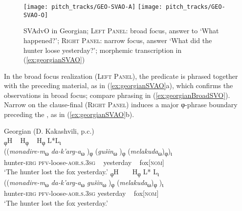 \documentclass[output=paper,colorlinks,citecolor=brown]{langscibook}
\begin{document}
\begin{figure}
    \texttt{[image: pitch\_tracks/GEO-SVAO-A]}
    \texttt{[image: pitch\_tracks/GEO-SVAO-O]}
    \caption{SVAdvO in Georgian; \textsc{Left Panel}: broad focus, answer to `What happened?’; \textsc{Right Panel}: narrow focus, answer `What did the hunter loose yesterday?’; morphemic transcription in (\ref{ex:georgianSVAO})}
    \label{fig:georgianSVAO}
\end{figure}

In the broad focus realization (\textsc{Left Panel}), the predicate is phrased together with the preceding material, as in (\ref{ex:georgianSVAO}a), which confirms the observations in broad focus; compare phrasing in (\ref{ex:georgianBroadSVO}). Narrow  on the clause-final  (\textsc{Right Panel}) induces a major φ-phrase boundary preceding the , as in (\ref{ex:georgianSVAO}b).

\ea \label{ex:georgianSVAO}
    Georgian (D. Kakashvili, p.c.) \\
    \ea 
        \glll \textup{\textsubscript{φ}H} ~ \textup{H\textsubscript{φ}} ~ \textup{H\textsubscript{φ}} \hspace{0.4cm}\textup{L*}\hspace{1.4cm}\textup{L\textsubscript{ι}}\\
            ((\textit{monadire-m}\textsubscript{ω} \textit{da-k’arg-a}\textsubscript{ω} )\textsubscript{φ} (\textit{gušin}\textsubscript{ω} )\textsubscript{φ} (\textit{melakuda}\textsubscript{ω})\textsubscript{φ})\textsubscript{ι}\\
            hunter-\textsc{erg} \textsc{pfv-}loose-\textsc{aor.s.3sg} ~ yesterday ~ fox\textsc{[nom]}\\
            \glt ‘The hunter lost the fox yesterday.’
    \ex 
        \glll \textup{\textsubscript{φ}H} ~ ~ \textup{H\textsubscript{φ}} \hspace{0.4cm}\textup{L*} \textup{L\textsubscript{ι}} \\
            ((\textit{monadire-m}\textsubscript{ω}  \textit{da-k’arg-a}\textsubscript{ω} \textit{gušin}\textsubscript{ω} )\textsubscript{φ} (\textit{melakuda}\textsubscript{ω})\textsubscript{φ} )\textsubscript{ι}\\
            hunter-\textsc{erg} \textsc{pfv-}loose-\textsc{aor.s.3sg} yesterday ~ fox\textsc{[nom]}\\
            \glt ‘The hunter lost the fox yesterday.’
    \z
\z
\end{document}
